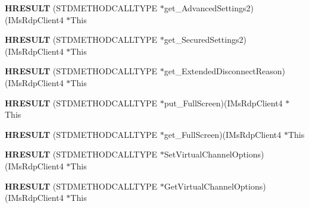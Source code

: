 \begin{DoxyCompactItemize}
\item 
\mbox{\label{struct_i_ms_rdp_client4_vtbl_a87d4f839f999bf9b3897c0200f4530ea}} 
{\bfseries H\+R\+E\+S\+U\+LT} (S\+T\+D\+M\+E\+T\+H\+O\+D\+C\+A\+L\+L\+T\+Y\+PE $\ast$get\+\_\+\+Advanced\+Settings2)(I\+Ms\+Rdp\+Client4 $\ast$This
\item 
\mbox{\label{struct_i_ms_rdp_client4_vtbl_adaa4d105c3f037841901c321bbb76855}} 
{\bfseries H\+R\+E\+S\+U\+LT} (S\+T\+D\+M\+E\+T\+H\+O\+D\+C\+A\+L\+L\+T\+Y\+PE $\ast$get\+\_\+\+Secured\+Settings2)(I\+Ms\+Rdp\+Client4 $\ast$This
\item 
\mbox{\label{struct_i_ms_rdp_client4_vtbl_a8794e33049f679663c45e2d2507c368c}} 
{\bfseries H\+R\+E\+S\+U\+LT} (S\+T\+D\+M\+E\+T\+H\+O\+D\+C\+A\+L\+L\+T\+Y\+PE $\ast$get\+\_\+\+Extended\+Disconnect\+Reason)(I\+Ms\+Rdp\+Client4 $\ast$This
\item 
\mbox{\label{struct_i_ms_rdp_client4_vtbl_a354b753ba5a3834fe08c2049058ab8dd}} 
{\bfseries H\+R\+E\+S\+U\+LT} (S\+T\+D\+M\+E\+T\+H\+O\+D\+C\+A\+L\+L\+T\+Y\+PE $\ast$put\+\_\+\+Full\+Screen)(I\+Ms\+Rdp\+Client4 $\ast$This
\item 
\mbox{\label{struct_i_ms_rdp_client4_vtbl_a0fcd5bf8851340870242d2de5841b1d7}} 
{\bfseries H\+R\+E\+S\+U\+LT} (S\+T\+D\+M\+E\+T\+H\+O\+D\+C\+A\+L\+L\+T\+Y\+PE $\ast$get\+\_\+\+Full\+Screen)(I\+Ms\+Rdp\+Client4 $\ast$This
\item 
\mbox{\label{struct_i_ms_rdp_client4_vtbl_a2e93d706f4b412911e9535ecd36b4bb9}} 
{\bfseries H\+R\+E\+S\+U\+LT} (S\+T\+D\+M\+E\+T\+H\+O\+D\+C\+A\+L\+L\+T\+Y\+PE $\ast$Set\+Virtual\+Channel\+Options)(I\+Ms\+Rdp\+Client4 $\ast$This
\item 
\mbox{\label{struct_i_ms_rdp_client4_vtbl_acf135c2e77809b5587ef1ee8181b90a7}} 
{\bfseries H\+R\+E\+S\+U\+LT} (S\+T\+D\+M\+E\+T\+H\+O\+D\+C\+A\+L\+L\+T\+Y\+PE $\ast$Get\+Virtual\+Channel\+Options)(I\+Ms\+Rdp\+Client4 $\ast$This
\item 
\mbox{\label{struct_i_ms_rdp_client4_vtbl_afc86a838604a49bb5c4d83152a020255}} 

\end{DoxyCompactItemize}
